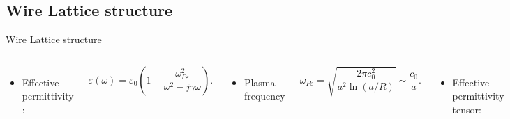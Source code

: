 \subsection{Wire Lattice structure}

\begin{frame}{Wire Lattice structure}
    \begin{columns}
        \begin{itemize}
            \item Effective permittivity \cite{PhysRevLett.76.4773}:
        \end{itemize}
        \begin{equation*}
            \varepsilon (\omega) = \varepsilon_0 \left( 1 - \dfrac{\omega_{P \varepsilon}^2}{\omega^2 - j \gamma \omega } \right).
        \end{equation*}
        \begin{itemize}
            \item Plasma frequency
        \end{itemize}
        \begin{equation*}
            \omega_{P \varepsilon} = \sqrt{ \dfrac{2 \pi c_0^2}{a^2 \ln (a/R)} } \sim \dfrac{c_0}{a}.
        \end{equation*}
        \begin{itemize}
            \item Effective permittivity tensor:
        \end{itemize}
        \begin{equation*}
            \varepsilon_{eff} = \left(
            \begin{array}{ccc}
                \varepsilon_0 & 0 & 0 \\
                0 & \varepsilon_0 & 0 \\ 
                0 & 0 & \varepsilon (\omega)
            \end{array}
            \right) .
        \end{equation*}


\end{columns}
\end{frame}
